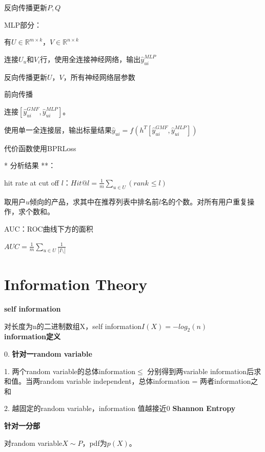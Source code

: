 \documentclass[UTF8]{ctexart}
\begin{document}
  \quad \quad 反向传播更新$P, Q$

  \quad MLP部分：

  \quad \quad 有$U \in \mathbb{R}^{m \times k}$，$V \in \mathbb{R}^{n \times k}$

  \quad \quad 连接$U_u$和$V_i$行，使用全连接神经网络，输出$\hat{y}_{ui}^{MLP}$

  \quad \quad 反向传播更新$U$，$V$，所有神经网络层参数

  \quad 前向传播

  \quad \quad 连接$[\hat{y}_{ui}^{GMF}, \hat{y}_{ui}^{MLP}]$。
  
  \quad \quad 使用单一全连接层，输出标量结果$\hat{y}_{ui} = f(h^T[\hat{y}_{ui}^{GMF}, \hat{y}_{ui}^{MLP}])$

  \quad 代价函数使用BPRLoss

  \quad ** 分析结果 **：

  \quad \quad hit rate at cut off $l$：$Hit @ l = \frac{1}{m}\sum_{u \in U}(rank_{} \leq l)$

  \quad \quad \quad 取用户$u$倾向的产品，求其中在推荐列表中排名前$l$名的个数。对所有用户重复操作，求个数和。

  \quad \quad AUC：ROC曲线下方的面积

  \quad \quad \quad $AUC = \frac{1}{m}\sum_{u \in U}\frac{1}{|I \setminus |}$
  
\section{Information Theory}
\noindent \textbf{self information}

  对长度为n的二进制数组X，self information$I(X) = -log_2(n)$\\
\textbf{information定义}

  0. \textbf{针对一random variable}

  1. 两个random variable的总体information$\leq$ 分别得到两variable information后求和值。当两random variable independent，总体information = 两者information之和

  2. 越固定的random variable，information 值越接近0
\textbf{Shannon Entropy}

  \textbf{针对一分部}

  对random variable$X \sim P$，pdf为$p(X)$。
  
\end{document}
